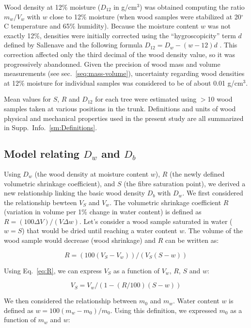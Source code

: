\documentclass[a4paper, 12pt, leqno, dvipsnames]{article}\usepackage[]{graphicx}\usepackage[]{color}
\begin{document}
Wood density at 12\% moisture ($D_{12}$ in g/cm$^3$) was obtained computing the ratio $m_w/V_w$ with $w$ close to 12\% moisture (when wood samples were stabilized at 20$^\circ$C temperature and 65\% humidity). Because the moisture content $w$ was not exactly 12\%, densities were initially corrected using the ``hygroscopicity'' term $d$ defined by Sallenave and the following formula $D_{12}=D_w-(w-12)d$ \citep{Sallenave1971}. This correction affected only the third decimal of the wood density value, so it was progressively abandonned. Given the precision of wood mass and volume measurements (see sec.~\ref{seq:mass-volume}), uncertainty regarding wood densities at 12\% moisture for individual samples was considered to be of about 0.01 g/cm$^3$.

Mean values for $S$, $R$ and $D_{12}$ for each tree were estimated using $>$10 wood samples taken at various positions in the trunk. Definitions and units of wood physical and mechanical properties used in the present study are all summarized in Supp.~Info.~\ref{sm:Definitions}.

\subsection{Model relating $D_{w}$ and $D_b$}

Using $D_{w}$ (the wood density at moisture content $w$), $R$ (the newly defined volumetric shrinkage coefficient), and $S$ (the fibre saturation point), we derived a new relationship linking the basic wood density $D_b$ with $D_w$. We first considered the relationship bewteen $V_S$ and $V_w$. The volumetric shrinkage coefficient $R$ (variation in volume per 1\% change in water content) is defined as $R=(100 \Delta V) / (V \Delta w)$. Let's consider a wood sample saturated in water ($w=S$) that would be dried until reaching a water content $w$. The volume of the wood sample would decrease (wood shrinkage) and $R$ can be written as: 

\begin{equation}
  R=(100(V_S-V_w))/(V_S(S-w))
  \label{eq:R}
\end{equation}

Using Eq.~\ref{eq:R}, we can express $V_S$ as a function of $V_w$, $R$, $S$ and $w$:

\begin{equation}
  V_S=V_w/(1-(R/100)(S-w))
  \label{eq:V_S}
\end{equation}

We then considered the relationship between $m_0$ and $m_w$. Water content $w$ is defined as $w=100(m_w-m_0)/m_0$. Using this definition, we expressed $m_0$ as a function of $m_w$ and $w$: 
\end{document}
